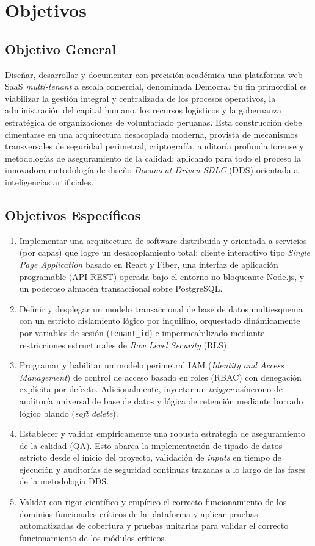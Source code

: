 \section{Objetivos}
\subsection{Objetivo General}
Diseñar, desarrollar y documentar con precisión académica una plataforma web SaaS \textit{multi-tenant} a escala comercial, denominada Democra. Su fin primordial es viabilizar la gestión integral y centralizada de los procesos operativos, la administración del capital humano, los recursos logísticos y la gobernanza estratégica de organizaciones de voluntariado peruanas. Esta construcción debe cimentarse en una arquitectura desacoplada moderna, provista de mecanismos transversales de seguridad perimetral, criptografía, auditoría profunda forense y metodologías de aseguramiento de la calidad; aplicando para todo el proceso la innovadora metodología de diseño \textit{Document-Driven SDLC} (DDS) orientada a inteligencias artificiales.

\subsection{Objetivos Específicos}
\begin{enumerate}[label=\alph*.]
    \item Implementar una arquitectura de software distribuida y orientada a servicios (por capas) que logre un desacoplamiento total: cliente interactivo tipo \textit{Single Page Application} basado en React y Fiber, una interfaz de aplicación programable (API REST) operada bajo el entorno no bloqueante Node.js, y un poderoso almacén transaccional sobre PostgreSQL.
    \item Definir y desplegar un modelo transaccional de base de datos multiesquema con un estricto aislamiento lógico por inquilino, orquestado dinámicamente por variables de sesión (\texttt{tenant\_id}) e impermeabilizado mediante restricciones estructurales de \textit{Row Level Security} (RLS).
    \item Programar y habilitar un modelo perimetral IAM (\textit{Identity and Access Management}) de control de acceso basado en roles (RBAC) con denegación explícita por defecto. Adicionalmente, inyectar un \textit{trigger} asíncrono de auditoría universal de base de datos y lógica de retención mediante borrado lógico blando (\textit{soft delete}).
    \item Establecer y validar empíricamente una robusta estrategia de aseguramiento de la calidad (QA). Esto abarca la implementación de tipado de datos estricto desde el inicio del proyecto, validación de \textit{inputs} en tiempo de ejecución y auditorías de seguridad continuas trazadas a lo largo de las fases de la metodología DDS.
    \item Validar con rigor científico y empírico el correcto funcionamiento de los dominios funcionales críticos de la plataforma y aplicar pruebas automatizadas de cobertura y pruebas unitarias para validar el correcto funcionamiento de los m\'odulos cr\'iticos.
\end{enumerate}
